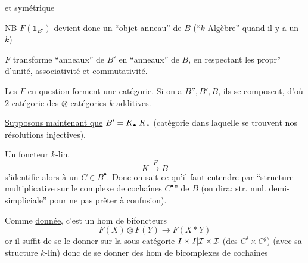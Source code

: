 
et symétrique


NB $F(\mathbf1_{B'})$ devient donc un ``objet-anneau'' de $B$ (``$k$-Algèbre'' quand il y a un $k$)

$F$ transforme ``anneaux'' de $B'$ en ``anneaux'' de $B$, en respectant les propr$^{{s}}$ d'unité, associativité et commutativité.

Les $F$ en question forment une catégorie. Si on a $B'',B',B$, ils se composent, d'où $2$-catégorie des $\otimes$-catégories $k$-additives.

\uline{Supposons maintenant que} $B'={K_\bullet|K_*}$ (catégorie dans laquelle se trouvent  nos résolutions injectives).

Un foncteur $k$-lin.
\[
K\xrightarrow{F}B
\]
s'identifie alors à un $C\in B^\bullet$. Donc on sait ce qu'il faut entendre par ``structure multiplicative sur le complexe de cochaînes $C^\bullet$'' de $B$ (on dira: str. mul. demi-simpliciale'' pour ne pas prêter à confusion).

Comme \uline{donnée}, c'est un hom de bifoncteurs
\[
F(X)\otimes F(Y)\longrightarrow F(X*Y)
\]
or il suffit de se le donner sur la sous catégorie  ${I\times I|\mathcal I\times\mathcal I}$  (des $C^i\times C^j$) (avec sa structure $k$-lin) donc de se donner des hom de bicomplexes de cochaînes

